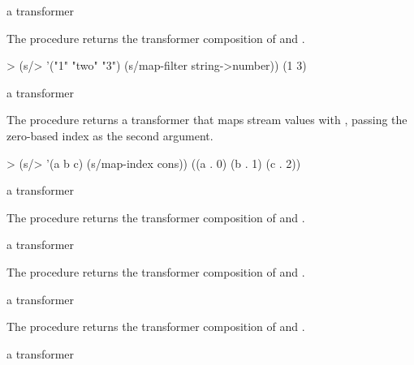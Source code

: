 \begin{procedure}
\end{procedure}
\returns{} a transformer

The  procedure returns the transformer composition of  and .

\codebegin
> (s/> '("1" "two" "3") (s/map-filter string->number))
(1 3)
\codeend

\begin{procedure}
\end{procedure}
\returns{} a transformer

The  procedure returns a transformer that maps stream values with
, passing the zero-based index as the second argument.

\codebegin
> (s/> '(a b c) (s/map-index cons))
((a . 0) (b . 1) (c . 2))
\codeend

\begin{procedure}
\end{procedure}
\returns{} a transformer

The  procedure returns the transformer composition of  and .

\begin{procedure}
\end{procedure}
\returns{} a transformer

The  procedure returns the transformer composition of  and .

\begin{procedure}
\end{procedure}
\returns{} a transformer

The  procedure returns the transformer composition of  and .

\begin{procedure}
\end{procedure}
\returns{} a transformer


